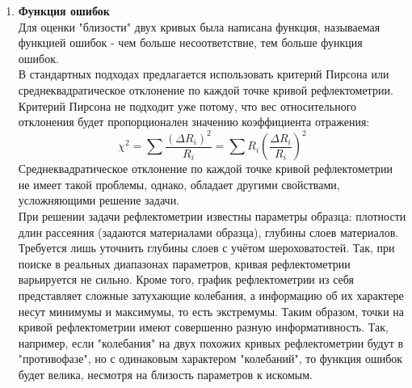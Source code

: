 \documentclass[a4paper]{article}
\begin{document}
\begin{enumerate}
где \( \mathrm{Ndots}_{\mathrm{norm}} \) - количество точек, которым аппроксимируется гауссов профиль, 
\( dq_i \) - i-й шаг сетки, 
\( \sigma \) - разрешение установки, 
\( q_i \) - длина волнового вектора на i-й итерации.

Следовательно, получаем рекуррентное соотношение для значений сетки:
\begin{equation}
    q_{i+1} = q_{i} + \frac{6\sigma q_i}{Ndots_{norm}}
\end{equation}

Таким образом, получается минимальный набор точек, необходимый для работы свёртки над моделируемой выборкой измерений.

\section*{Решение обратной задачи}
Основная сложность в задаче рефлектометрии - это решение обратной задачи рассеяния, поскольку она не имеет решения в общем виде.\\
Необходимо подобрать параметры образца так, чтобы данная (экспериментальная) и моделируемая кривые рефлектометрии совпали, или хотя бы были максимально близки друг к другу.
\item \textbf{Функция ошибок}\\
Для оценки "близости" двух кривых была написана функция, называемая функцией ошибок - чем больше несоответствие, тем больше функция ошибок.\\
В стандартных подходах предлагается использовать критерий Пирсона или среднеквадратическое отклонение по каждой точке кривой рефлектометрии. Критерий Пирсона не подходит уже потому, что вес относительного отклонения будет пропорционален значению коэффициента отражения: 
\begin{equation}
    \chi^2 =\sum{\frac{(\Delta R_i)^2}{R_i}}= \sum{R_i(\frac{\Delta R_i}{R_i})^2}
\end{equation}
Среднеквадратическое отклонение по каждой точке кривой рефлектометрии не имеет такой проблемы, однако, обладает другими свойствами, усложняющими решение задачи.\\
При решении задачи рефлектометрии известны параметры образца: плотности длин рассеяния (задаются материалами образца), глубины слоев материалов. Требуется лишь уточнить глубины слоев с учётом шероховатостей. Так, при поиске в реальных диапазонах параметров, кривая рефлектометрии варьируется не сильно. 
Кроме того, график рефлектометрии из себя представляет сложные затухающие колебания, а информацию об их характере несут минимумы и максимумы, то есть экстремумы. Таким образом, точки на кривой рефлектометрии имеют совершенно разную информативность. Так, например, если "колебания" на двух похожих кривых рефлектометрии будут в "противофазе", но с одинаковым характером "колебаний", то функция ошибок будет велика, несмотря на близость параметров к искомым.\\

\end{enumerate}
\end{document}
